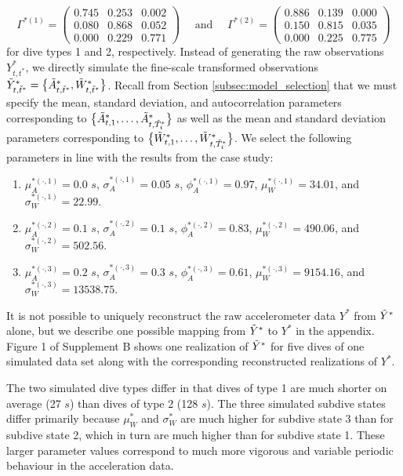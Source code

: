 \[\Gamma^{*(1)} = \begin{pmatrix} 0.745 & 0.253 & 0.002 \\ 0.080 & 0.868 & 0.052 \\ 0.000 & 0.229 & 0.771 \end{pmatrix} \quad \text{ and } \quad \Gamma^{*(2)} = \begin{pmatrix} 0.886 & 0.139 & 0.000 \\ 0.150 & 0.815 & 0.035 \\ 0.000 & 0.225 & 0.775 \end{pmatrix}\]
%
for dive types 1 and 2, respectively.
Instead of generating the raw observations $Y^*_{t,t^*}$, we directly simulate the fine-scale transformed observations $\tilde{Y}^*_{t,\tilde t^*} = \big\{\tilde{A}^*_{t,\tilde t^*}, \tilde{W}^*_{t,\tilde t^*}\big\}$. Recall from Section \ref{subsec:model_selection} that we must specify the mean, standard deviation, and autocorrelation parameters corresponding to $\big\{\tilde{A}^*_{t,1},\ldots,\tilde{A}^*_{t,\tilde T_t^*}\big\}$ as well as the mean and standard deviation parameters corresponding to $\big\{\tilde{W}^*_{t,1},\ldots,\tilde{W}^*_{t,\tilde T_t^*}\big\}$. We select the following parameters in line with the results from the case study:

\begin{enumerate}
    \item $\mu_A^{*(\cdot,1)} = 0.0$ $s$, $\sigma_A^{*(\cdot,1)} = 0.05$ $s$, $\phi_A^{*(\cdot,1)} = 0.97$, $\mu_W^{*(\cdot,1)} = 34.01$, and $\sigma_W^{*(\cdot,1)} = 22.99$.
    \item $\mu_A^{*(\cdot,2)} = 0.1$ $s$, $\sigma_A^{*(\cdot,2)} = 0.1$ $s$, $\phi_A^{*(\cdot,2)} = 0.83$, $\mu_W^{*(\cdot,2)} = 490.06$, and $\sigma_W^{*(\cdot,2)} = 502.56$.
    \item $\mu_A^{*(\cdot,3)} = 0.2$ $s$, $\sigma_A^{*(\cdot,3)} = 0.3$ $s$, $\phi_A^{*(\cdot,3)} = 0.61$, $\mu_W^{*(\cdot,3)} = 9154.16$, and $\sigma_W^{*(\cdot,3)} = 13538.75$.
\end{enumerate}
%
It is not possible to uniquely reconstruct the raw accelerometer data $Y^*$ from $\tilde{Y}^*$ alone, but we describe one possible mapping from $\tilde{Y}^*$ to $Y^*$ in the appendix. Figure 1 of Supplement B shows one realization of $\tilde{Y}^*$ for five dives of one simulated data set along with the corresponding reconstructed realizations of $Y^*$. 

The two simulated dive types differ in that dives of type 1 are much shorter on average (27 $s$) than dives of type 2 (128 $s$). The three simulated subdive states differ primarily because $\mu_W^*$ and $\sigma_W^*$ are much higher for subdive state 3 than for subdive state 2, which in turn are much higher than for subdive state 1. These larger parameter values correspond to much more vigorous and variable periodic behaviour in the acceleration data. 

